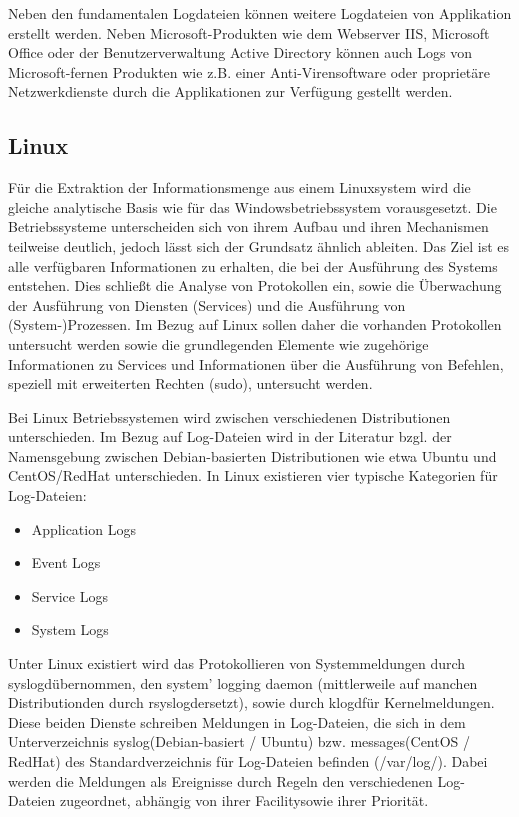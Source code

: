 Neben den fundamentalen Logdateien können weitere Logdateien von Applikation erstellt werden. Neben Microsoft-Produkten wie dem Webserver IIS, Microsoft Office oder der Benutzerverwaltung Active Directory können auch Logs von Microsoft-fernen Produkten wie z.B. einer Anti-Virensoftware oder proprietäre Netzwerkdienste durch die Applikationen zur Verfügung gestellt werden.

\subsection{Linux}
Für die Extraktion der Informationsmenge aus einem Linuxsystem wird die gleiche analytische Basis wie für das Windowsbetriebssystem vorausgesetzt. Die Betriebssysteme unterscheiden sich von ihrem Aufbau und ihren Mechanismen teilweise deutlich, jedoch lässt sich der Grundsatz ähnlich ableiten. Das Ziel ist es alle verfügbaren Informationen zu erhalten, die bei der Ausführung des Systems entstehen. Dies schließt die Analyse von Protokollen ein, sowie die Überwachung der Ausführung von Diensten (Services) und die Ausführung von (System-)Prozessen.
Im Bezug auf Linux sollen daher die vorhanden Protokollen untersucht werden sowie die grundlegenden Elemente wie zugehörige Informationen zu Services und Informationen über die Ausführung von Befehlen, speziell mit erweiterten Rechten (sudo), untersucht werden.

Bei Linux Betriebssystemen wird zwischen verschiedenen Distributionen unterschieden. Im Bezug auf Log-Dateien wird in der Literatur bzgl. der Namensgebung zwischen Debian-basierten Distributionen wie etwa Ubuntu und CentOS/RedHat unterschieden. 
In Linux existieren vier typische Kategorien für Log-Dateien:
\begin{itemize}
\item Application Logs
\item Event Logs
\item Service Logs
\item System Logs
\end{itemize}

Unter Linux existiert wird das Protokollieren von Systemmeldungen durch \glqq syslogd\grqq  übernommen, den system' logging daemon (mittlerweile auf manchen Distributionden durch \glqq rsyslogd\grqq  ersetzt), sowie durch \glqq klogd\grqq  für Kernelmeldungen. Diese beiden Dienste schreiben Meldungen in Log-Dateien, die sich in dem Unterverzeichnis \glqq syslog\grqq  (Debian-basiert / Ubuntu) bzw. \glqq messages\grqq  (CentOS / RedHat) des Standardverzeichnis für Log-Dateien befinden (/var/log/). Dabei werden die Meldungen als Ereignisse durch Regeln den verschiedenen Log-Dateien zugeordnet, abhängig von ihrer \glqq Facility\grqq  sowie ihrer Priorität. 

